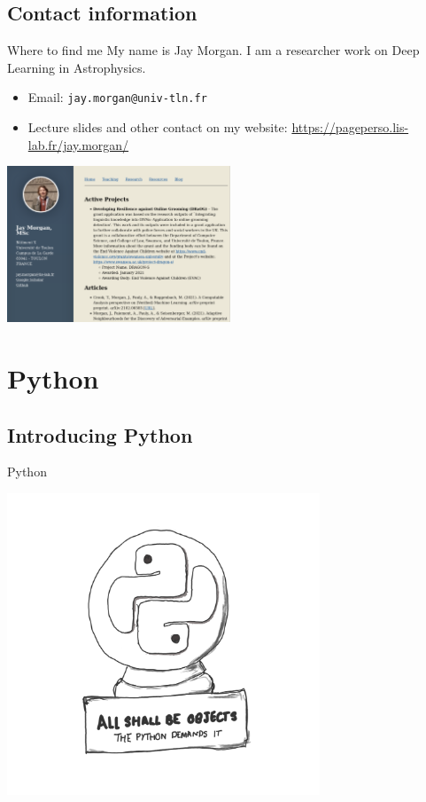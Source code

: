 \documentclass[10pt]{beamer}
\begin{document}
\subsection{Contact information}
\label{sec:orgdf03ff9}

\begin{frame}[label={sec:org8252c47},fragile]{Where to find me}
 My name is Jay Morgan. I am a researcher work on Deep Learning in Astrophysics.

\begin{itemize}
\item Email: \texttt{jay.morgan@univ-tln.fr}
\item Lecture slides and other contact on my website: \url{https://pageperso.lis-lab.fr/jay.morgan/}
\end{itemize}

\begin{center}
\includegraphics[width=0.5\textwidth]{./images/website.png}
\end{center}
\end{frame}

\section{Python}
\label{sec:orge7a1443}

\subsection{Introducing Python}
\label{sec:org59b23bf}

\begin{frame}[label={sec:orgea6a493}]{Python}
\begin{center}
\includegraphics[width=0.7\textwidth]{./images/python-objects.png}
\end{center}
\end{frame}
\end{document}
